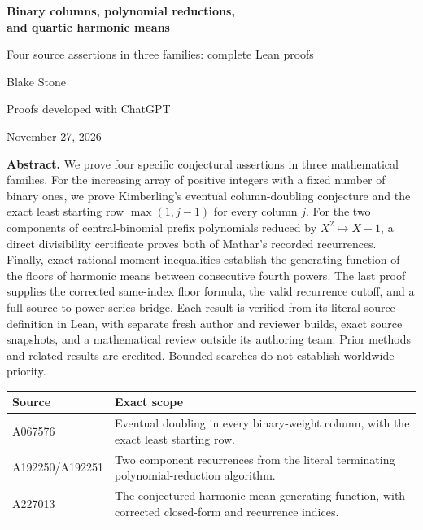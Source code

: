 \documentclass[11pt]{article}
\begin{document}
\begin{center}
{\LARGE\bfseries Binary columns, polynomial reductions,\\[3pt]
and quartic harmonic means}\par
\vspace{0.5em}
{\large Four source assertions in three families: complete Lean proofs}\par
\vspace{0.5em}
{\large Blake Stone}\par
Proofs developed with ChatGPT\par
November 27, 2026
\end{center}

\textbf{Abstract.}
We prove four specific conjectural assertions in three mathematical families.
For the increasing array of positive integers with a fixed number of binary
ones, we prove Kimberling's eventual column-doubling conjecture and the exact
least starting row $\max(1,j-1)$ for every column $j$. For the two components
of central-binomial prefix polynomials reduced by $X^2\mapsto X+1$, a direct
divisibility certificate proves both of Mathar's recorded recurrences.
Finally, exact rational moment inequalities establish the generating function
of the floors of harmonic means between consecutive fourth powers. The last
proof supplies the corrected same-index floor formula, the valid recurrence
cutoff, and a full source-to-power-series bridge.
Each result is verified from its literal source definition in Lean, with
separate fresh author and reviewer builds, exact source snapshots, and a
mathematical review outside its authoring team. Prior methods and related
results are credited. Bounded searches do not establish worldwide priority.

\begin{center}
\begin{tabular}{@{}l>{\raggedright\arraybackslash}p{4.3in}@{}}
\toprule
Source & Exact scope\\
\midrule
A067576 & Eventual doubling in every binary-weight column, with the exact least starting row.\\
A192250/A192251 & Two component recurrences from the literal terminating polynomial-reduction algorithm.\\
A227013 & The conjectured harmonic-mean generating function, with corrected closed-form and recurrence indices.\\
\bottomrule
\end{tabular}
\end{center}
\end{document}
